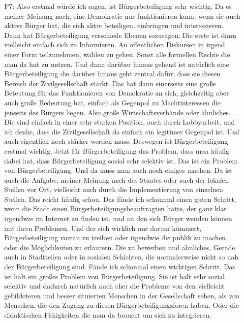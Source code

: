 \begin{itemize}
    \item[P7:] Also erstmal w{\"u}rde ich sagen, ist B{\"u}rgerbeteiligung sehr wichtig. Da es meiner Meinung nach, eine Demokratie nur funktionieren kann, wenn sie auch aktive B{\"u}rger hat, die sich aktiv beteiligen, einbringen und interessieren. Dann hat B{\"u}rgerbeteiligung verschiede Ebenen sozusagen. Die erste ist dann vielleicht einfach sich zu Informieren. An {\"o}ffentlichen Diskursen in irgend einer Form teilzunehmen, w{\"a}hlen zu gehen. Sonst alle formellen Rechte die man da hat zu nutzen. Und dann dar{\"u}ber hinaus gehend ist nat{\"u}rlich eine B{\"u}rgerbeteiligung die dar{\"u}ber hinaus geht zentral daf{\"u}r, dass sie diesen Bereich der Zivilgesellschaft st{\"a}rkt. Das hat dann einerseits eine gro{\ss}e Beteutung f{\"u}r das Funktionieren von Demokratie an sich, gleichzeitig aber auch gro{\ss}e Bedeutung hat, einfach als Gegenpol zu Machtinteressen die jenseits des B{\"u}rgers liegen. Also gro{\ss}e Wirtschaftsverb{\"a}nde oder {\"a}hnliches. Die sind einfach in einer sehr starken Position, auch durch Lobbyarbeit, und ich denke, dass die Zivilgesellschaft da einfach ein legitimer Gegenpol ist. Und auch eigentlich noch st{\"a}rker werden muss. Deswegen ist B{\"u}rgerbeteiligung erstmal wichtig. Jetzt f{\"u}r B{\"u}rgerbeteiligung das Problem, dass man h{\"a}ufig dabei hat, dass B{\"u}rgerbeteiligung sozial sehr selektiv ist. Das ist ein Problem von B{\"u}rgerbeteiligung. Und da muss man auch noch einiges machen. Da ist auch die Aufgabe, meiner Meinung nach des Staates oder auch der lokalen Stellen vor Ort, vielleicht auch durch die Implementierung von einzelnen Stellen. Das reicht h{\"a}ufig schon. Das f{\"a}nde ich schonmal einen guten Schritt, wenn die Stadt einen B{\"u}rgerbeteiligungsbeauftragten h{\"a}tte, der ganz klar irgendwie im Internet zu finden ist, und an den sich B{\"u}rger wenden k{\"o}nnen mit ihren Problemen. Und der sich wirklich nur darum k{\"u}mmert, B{\"u}rgerbeteiligung vorran zu treiben oder irgendwie die publik zu machen, oder die M{\"o}glichkeiten zu erl{\"a}utern. Die zu bewerben und {\"a}hnliches. Gerade auch in Stadtteilen oder in sozialen Schichten, die normalerweise nicht so nah der B{\"u}rgerbeteiligung sind. F{\"a}nde ich schonmal einen wichtigen Schritt. Das ist halt ein gro{\ss}es Problem von B{\"u}rgerbeteiligung. Sie ist halt sehr sozial selektiv und dadurch nat{\"u}rlich auch eher die Probleme von den vielleicht gebildeteren und besser situierten Menschen in der Gesellschaft sehen, als von Menschen, die den Zugang zu diesen B{\"u}rgerbeteiligungsforen haben. Oder die didaktischen F{\"a}higkeiten die man da braucht um sich zu integrieren. 
\end{itemize}

